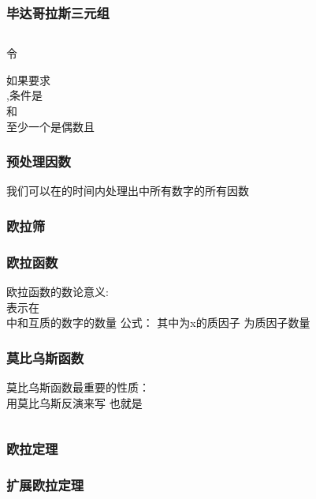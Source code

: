 \documentclass[8pt,a4paper]{article}
\newcommand{\code}[1]{
    
}
\newcommand{\txt}[1]{\par\noindent\footnotesize #1}
\newcommand{\inlineformula}[1]{\ensuremath{}}
\newcommand{\displayformula}[1]{%
    \vspace{0.2em}
    \[
        
    \]
}
\begin{document}
\begin{multicols}{2}
        \subsubsection{毕达哥拉斯三元组}
            \txt{\displayformula{./assets/formulas_tex/formula_028.tex}
令\displayformula{./assets/formulas_tex/formula_029.tex}
如果要求\displayformula{./assets/formulas_tex/formula_030.tex},条件是\displayformula{./assets/formulas_tex/formula_031.tex}和\displayformula{./assets/formulas_tex/formula_032.tex}至少一个是偶数且\displayformula{./assets/formulas_tex/formula_033.tex}}
        \subsubsection{预处理因数}
            \txt{我们可以在\inlineformula{./assets/formulas_tex/formula_034.tex}的时间内处理出\inlineformula{./assets/formulas_tex/formula_035.tex}中所有数字的所有因数}
            \code{src/number_theory/数论定理_3_5.cpp}
        \subsubsection{欧拉筛}
            \code{src/number_theory/数论定理_4_5.cpp}
        \subsubsection{欧拉函数}
            \txt{欧拉函数的数论意义: \displayformula{./assets/formulas_tex/formula_036.tex}表示在\displayformula{./assets/formulas_tex/formula_037.tex}中和\inlineformula{./assets/formulas_tex/formula_038.tex}互质的数字的数量
公式：\inlineformula{./assets/formulas_tex/formula_039.tex} 其中\inlineformula{./assets/formulas_tex/formula_040.tex}为x的质因子 \inlineformula{./assets/formulas_tex/formula_041.tex}为质因子数量}
            \code{src/number_theory/数论定理_5_5.cpp}
        \subsubsection{莫比乌斯函数}
            \txt{莫比乌斯函数最重要的性质：\displayformula{./assets/formulas_tex/formula_042.tex} 用莫比乌斯反演来写 也就是 \displayformula{./assets/formulas_tex/formula_043.tex}
\displayformula{./assets/formulas_tex/formula_044.tex}}
            \code{src/number_theory/数论定理_6_5.cpp}
        \subsubsection{欧拉定理}
        \subsubsection{扩展欧拉定理}

\end{multicols}
\end{document}
